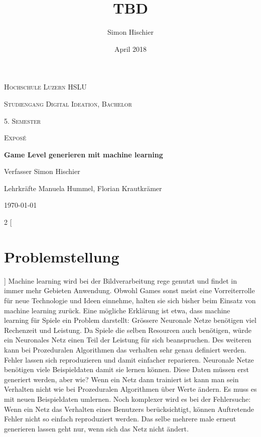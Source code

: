 \documentclass[10pt,a4paper]{article}
\title{TBD}
\author{Simon Hischier}
\date{April 2018}
\begin{document}
\begin{titlepage}
\centering
\vspace{1cm}
	{\scshape\LARGE Hochschule Luzern HSLU \par}
	\vspace{1cm}
	{\scshape\Large Studiengang Digital Ideation, Bachelor \par}
	
	{\scshape\Large 5. Semester\par}
	{\scshape\Large Exposé \par}
	\vspace{1.5cm}
	{\huge\bf Game Level generieren mit machine learning\par}
	
	\vspace{10cm}
	{\Large Verfasser Simon Hischier\par}
	{\Large Lehrkräfte Manuela Hummel, Florian Krautkrämer\par}
	\vfill

	{\large \today\par}
\end{titlepage}

\begin{multicols}{2}
[
\section{Problemstellung}
]
Machine learning wird bei der Bildverarbeitung rege genutzt und findet in immer mehr Gebieten Anwendung. Obwohl Games sonst meist eine Vorreiterrolle für neue Technologie und Ideen einnehme, halten sie sich bisher beim Einsatz von machine learning zurück. Eine mögliche Erklärung ist etwa, dass machine learning für Spiele ein Problem darstellt: Grössere Neuronale Netze benötigen viel Rechenzeit und Leistung. Da Spiele die selben Resourcen auch benötigen, würde ein Neuronales Netz einen Teil der Leistung für sich beanspruchen. Des weiteren kann bei Prozeduralen Algorithmen das verhalten sehr genau definiert werden. Fehler lassen sich reproduzieren und damit einfacher reparieren. Neuronale Netze benötigen viele Beispieldaten damit sie lernen können. Diese Daten müssen erst generiert werden, aber wie? Wenn ein Netz dann trainiert ist kann man sein Verhalten nicht wie bei Prozeduralen Algorithmen über Werte ändern. Es muss es mit neuen Beispieldaten umlernen. Noch komplexer wird es bei der Fehlersuche: Wenn ein Netz das Verhalten eines Benutzers berücksichtigt, können Auftretende Fehler nicht so einfach reproduziert werden. Das selbe mehrere male erneut generieren lassen geht nur, wenn sich das Netz nicht ändert.
\end{multicols}
\end{document}
